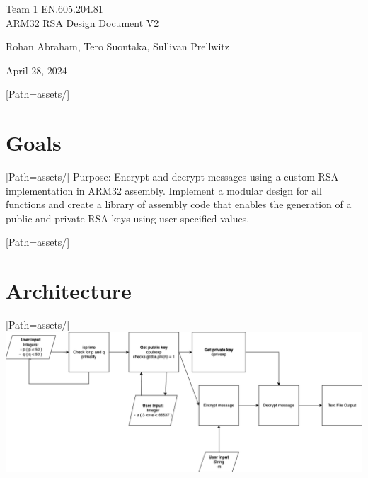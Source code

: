 \documentclass{article}
\begin{document}
\begin{titlepage}

\begin{flushright}

\vspace{7.5cm}

\Huge Team 1 EN.605.204.81 \\ ARM32 RSA Design Document V2

\vspace{0.5cm}

\Large Rohan Abraham, Tero Suontaka, Sullivan Prellwitz

\vspace{8cm}

\normalsize April 28, 2024

\end{flushright}

\end{titlepage}
\newpage
\tableofcontents
\newpage
\setmainfont{OpenSans-VariableFont_wdth,wght.ttf}[Path=assets/]
\section{Goals}
\setmainfont{OpenSans-VariableFont_wdth,wght.ttf}[Path=assets/]
Purpose: Encrypt and decrypt messages using a custom RSA implementation in ARM32 assembly.
Implement a modular design for all functions and create a library of assembly code that enables the generation of a public and private RSA keys using user specified values.
\newpage

\setmainfont{OpenSans-VariableFont_wdth,wght.ttf}[Path=assets/]
\section{Architecture}
\setmainfont{OpenSans-VariableFont_wdth,wght.ttf}[Path=assets/]
\includegraphics[scale=0.44]{assets/rsa-impl.drawio.png}
\end{document}
